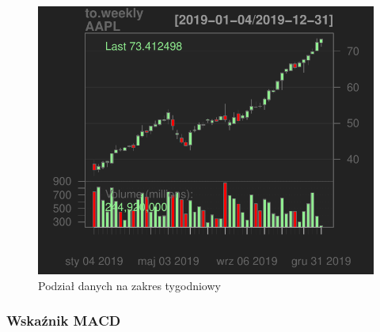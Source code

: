 \documentclass[12pt, a4paper]{article}\usepackage[]{graphicx}\usepackage[]{color}
\makeatletter
\def\maxwidth{ %
  \ifdim\Gin@nat@width>\linewidth
    \linewidth
  \else
    \Gin@nat@width
  \fi
}
\newenvironment{knitrout}{}{} %
\makeatother
\begin{document}
\begin{knitrout}
\color{fgcolor}\begin{figure}[H]

{\centering \includegraphics[width=\maxwidth]{figure/unnamed-chunk-2-1} 

}

\caption[Podział danych na zakres tygodniowy]{Podział danych na zakres tygodniowy}\label{fig:unnamed-chunk-2}
\end{figure}

\end{knitrout}

\subsubsection{Wskaźnik MACD}
\end{document}
